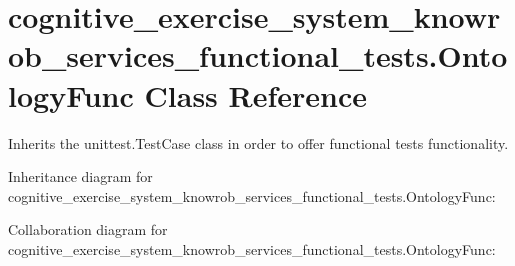 \hypertarget{classcognitive__exercise__system__knowrob__services__functional__tests_1_1OntologyFunc}{\section{cognitive\-\_\-exercise\-\_\-system\-\_\-knowrob\-\_\-services\-\_\-functional\-\_\-tests.\-Ontology\-Func Class Reference}
\label{classcognitive__exercise__system__knowrob__services__functional__tests_1_1OntologyFunc}
}


Inherits the unittest.\-Test\-Case class in order to offer functional tests functionality.  




Inheritance diagram for cognitive\-\_\-exercise\-\_\-system\-\_\-knowrob\-\_\-services\-\_\-functional\-\_\-tests.\-Ontology\-Func\-:


Collaboration diagram for cognitive\-\_\-exercise\-\_\-system\-\_\-knowrob\-\_\-services\-\_\-functional\-\_\-tests.\-Ontology\-Func\-:
